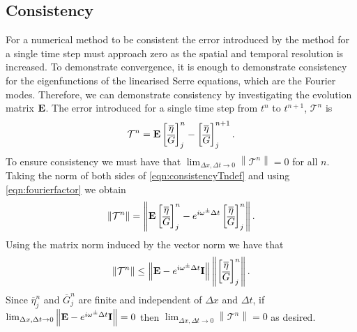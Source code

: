 \subsection{Consistency}
For a numerical method to be consistent the error introduced by the method for a single time step must approach zero as the spatial and temporal resolution is increased. To demonstrate convergence, it is enough to demonstrate consistency for the eigenfunctions of the linearised Serre equations, which are the Fourier modes. Therefore, we can demonstrate consistency by investigating the evolution matrix $\mathbf{E}$. The error introduced for a single time step from $t^n$ to $t^{n+1}$, $\mathcal{T}^n$ is
\begin{equation}
\mathcal{T}^n =  \mathbf{E}\begin{bmatrix}
\overline{\eta} \\ \overline{G}
\end{bmatrix}^{n}_j -  \begin{bmatrix}
\overline{\eta} \\ \overline{G}
\end{bmatrix}^{n+1}_j.
\label{eqn:consistencyTndef}
\end{equation}
To ensure consistency we must have that $ \lim_{\Delta x,\Delta t \rightarrow 0}\left \| \mathcal{T}^n \right \| = 0 $ for all $n$. Taking the norm of both sides of \eqref{eqn:consistencyTndef} and using \eqref{eqn:fourierfactor}  we obtain
\begin{equation*}
\left \|\mathcal{T}^n \right \| = \left \|  \mathbf{E}\begin{bmatrix}
\overline{\eta} \\ \overline{G}
\end{bmatrix}^{n}_j -  e^{i \omega^\pm \Delta t} \begin{bmatrix}
\overline{\eta} \\ \overline{G}
\end{bmatrix}^{n}_j \right \|.
\end{equation*}
Using the matrix norm induced by the vector norm we have that
\begin{equation}
\left \|\mathcal{T}^n \right \|  \le \left \| \mathbf{E} -  e^{i \omega^\pm \Delta t}\mathbf{I} \right \| \left \| \begin{bmatrix}
\overline{\eta} \\ \overline{G}
\end{bmatrix}^{n}_j\right \|.
\end{equation}
Since $\overline{\eta}^n_j$ and  $\overline{G}^n_j$ are finite and independent of $\Delta x$ and $\Delta t$, if $ \lim_{\Delta x,\Delta t \rightarrow 0} \left\| \mathbf{E} -  e^{i \omega^\pm \Delta t}\mathbf{I} \right\| = 0 $ then $ \lim_{\Delta x,\Delta t \rightarrow 0}\left \| \mathcal{T}^n \right \| = 0 $ as desired.

